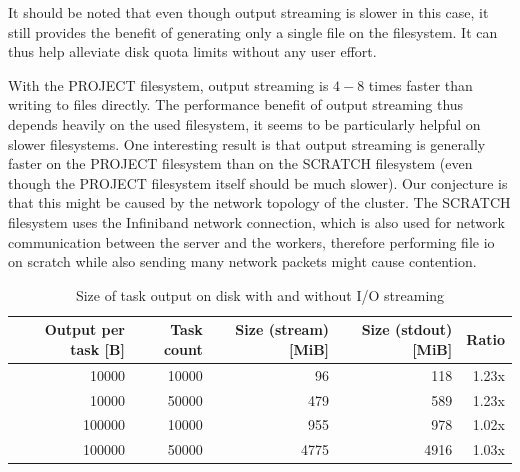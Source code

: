 It should be noted that even though output streaming is slower in this case, it still provides the
benefit of generating only a single file on the filesystem. It can thus help alleviate disk quota
limits without any user effort.

With the PROJECT filesystem, output streaming is $4-8$ times faster than writing
to files directly. The performance benefit of output streaming thus depends heavily on the used
filesystem, it seems to be particularly helpful on slower filesystems. One interesting result is
that output streaming is generally faster on the PROJECT filesystem than on the SCRATCH filesystem
(even though the PROJECT filesystem itself should be much slower). Our conjecture is that this
might be caused by the network topology of the cluster. The SCRATCH filesystem uses the Infiniband
network connection, which is also used for network communication between the server and the
workers, therefore performing file \gls{io} on scratch while also sending many
network packets might cause contention.


\begin{table}[h]
	\centering
	\begin{tabular}{|r|r|r|r|r|}
		\hline
		Output per task [B] & Task count & Size (stream) [MiB] & Size (stdout) [MiB] & Ratio \\ \hline
		10000               & 10000      & 96                  & 118                 & 1.23x \\ \hline
		10000               & 50000      & 479                 & 589                 & 1.23x \\ \hline
		100000              & 10000      & 955                 & 978                 & 1.02x \\ \hline
		100000              & 50000      & 4775                & 4916                & 1.03x \\ \hline
	\end{tabular}
	\caption{Size of task output on disk with and without I/O streaming}
	\label{tab:hq-io-streaming-size}
\end{table}


